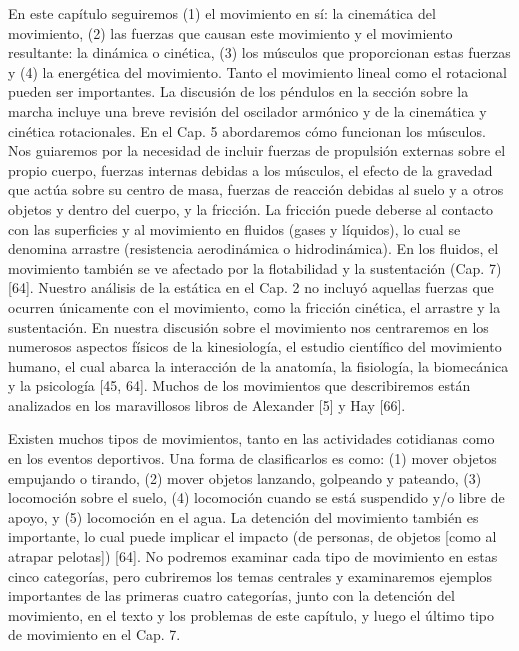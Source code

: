 \documentclass[12pt]{book}
\begin{document}
En este capítulo seguiremos (1) el movimiento en sí: la cinemática del movimiento, (2) las fuerzas que causan este movimiento y el movimiento resultante: la dinámica o cinética, (3) los músculos que proporcionan estas fuerzas y (4) la energética del movimiento. Tanto el movimiento lineal como el rotacional pueden ser importantes. La discusión de los péndulos en la sección sobre la marcha incluye una breve revisión del oscilador armónico y de la cinemática y cinética rotacionales. En el Cap. 5 abordaremos cómo funcionan los músculos. Nos guiaremos por la necesidad de incluir fuerzas de propulsión externas sobre el propio cuerpo, fuerzas internas debidas a los músculos, el efecto de la gravedad que actúa sobre su centro de masa, fuerzas de reacción debidas al suelo y a otros objetos y dentro del cuerpo, y la fricción. La fricción puede deberse al contacto con las superficies y al movimiento en fluidos (gases y líquidos), lo cual se denomina arrastre (resistencia aerodinámica o hidrodinámica). En los fluidos, el movimiento también se ve afectado por la flotabilidad y la sustentación (Cap. 7) [64]. Nuestro análisis de la estática en el Cap. 2 no incluyó aquellas fuerzas que ocurren únicamente con el movimiento, como la fricción cinética, el arrastre y la sustentación. En nuestra discusión sobre el movimiento nos centraremos en los numerosos aspectos físicos de la kinesiología, el estudio científico del movimiento humano, el cual abarca la interacción de la anatomía, la fisiología, la biomecánica y la psicología [45, 64]. Muchos de los movimientos que describiremos están analizados en los maravillosos libros de Alexander [5] y Hay [66].

Existen muchos tipos de movimientos, tanto en las actividades cotidianas como en los eventos deportivos. Una forma de clasificarlos es como: (1) mover objetos empujando o tirando, (2) mover objetos lanzando, golpeando y pateando, (3) locomoción sobre el suelo, (4) locomoción cuando se está suspendido y/o libre de apoyo, y (5) locomoción en el agua. La detención del movimiento también es importante, lo cual puede implicar el impacto (de personas, de objetos [como al atrapar pelotas]) [64]. No podremos examinar cada tipo de movimiento en estas cinco categorías, pero cubriremos los temas centrales y examinaremos ejemplos importantes de las primeras cuatro categorías, junto con la detención del movimiento, en el texto y los problemas de este capítulo, y luego el último tipo de movimiento en el Cap. 7.
\end{document}
